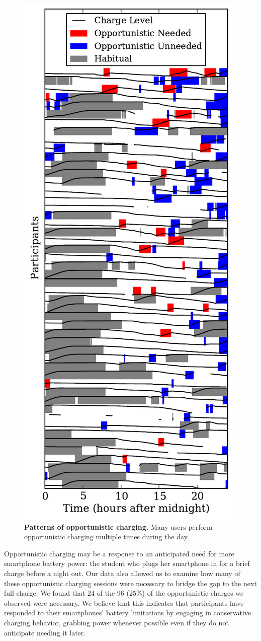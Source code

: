 \begin{figure}[th!]
\centering
\includegraphics[width=0.7\columnwidth]{./figs/opportunistic.pdf}
\caption{\textbf{Patterns of opportunistic charging.} Many users perform
opportunistic charging multiple times during the day.}
\label{fig-opportunistic-patterns}
\end{figure}

Opportunistic charging may be a response to an anticipated need for more
smartphone battery power: the student who plugs her smartphone in for a brief
charge before a night out. Our data also allowed us to examine how many of
these opportunistic charging sessions were necessary to bridge the gap to the
next full charge. We found that 24 of the 96 (25\%) of the opportunistic
charges we observed were necessary. We believe that this indicates that
participants have responded to their smartphones' battery limitations by
engaging in conservative charging behavior, grabbing power whenever possible
even if they do not anticipate needing it later.

